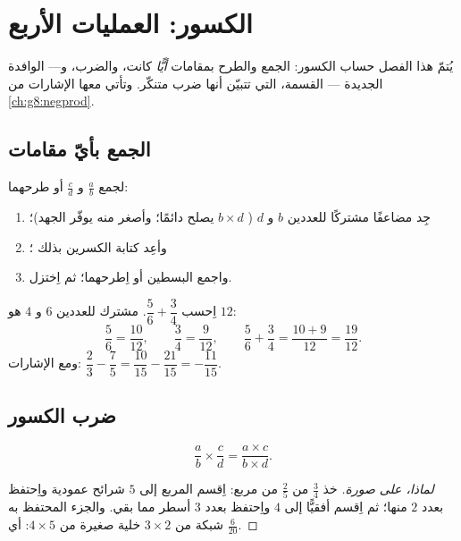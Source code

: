 \chapter{الكسور: العمليات الأربع}\label{ch:g8:fractions}

يُتمّ هذا الفصل حساب الكسور: الجمع والطرح
بمقامات \emph{أيًّا} كانت، والضرب، و---
الوافدة الجديدة --- القسمة، التي تتبيّن أنها ضرب
متنكّر. وتأتي معها الإشارات من \cref{ch:g8:negprod}.

\section{الجمع بأيّ مقامات}

\begin{method}\label{met:g8:fractions:add}
لجمع $\frac ab$ و $\frac cd$ أو طرحهما:
\begin{enumerate}
  \item جِد مضاعفًا مشتركًا للعددين $b$ و $d$ (
        $b \times d$ يصلح دائمًا؛ وأصغر منه يوفّر الجهد)؛
  \item وأعِد كتابة الكسرين بذلك ؛
  \item واجمع البسطين أو اِطرحهما؛ ثم اِختزل.
\end{enumerate}
\end{method}

\begin{example}\label{ex:g8:fractions:add}
اِحسب $\dfrac{5}{6} + \dfrac{3}{4}$.  مشترك للعددين $6$ و
$4$ هو $12$:
\[
\frac{5}{6} = \frac{10}{12},
\qquad
\frac{3}{4} = \frac{9}{12},
\qquad
\frac{5}{6} + \frac{3}{4} = \frac{10 + 9}{12} = \frac{19}{12}.
\]
ومع الإشارات: $\dfrac{2}{3} - \dfrac{7}{5} = \dfrac{10}{15} -
\dfrac{21}{15} = -\dfrac{11}{15}$.
\end{example}

\section{ضرب الكسور}

\begin{theorem}\label{thm:g8:fractions:mult}
\[
\frac{a}{b} \times \frac{c}{d} = \frac{a \times c}{b \times d} .
\]
\end{theorem}

\begin{proof}[لماذا، على صورة]
خذ $\frac34$ من $\frac25$ من مربع: اِقسم المربع إلى $5$
شرائح عمودية واِحتفظ بعدد $2$ منها؛ ثم اِقسم أفقيًّا إلى $4$ واِحتفظ بعدد $3$
أسطر مما بقي. والجزء المحتفظ به شبكة من $3 \times 2$ خلية
صغيرة من $4 \times 5$: أي  $\frac{6}{20}$.
\end{proof}

